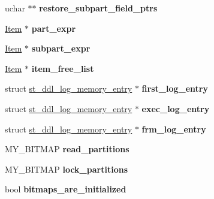 \begin{DoxyCompactItemize}
uchar $\ast$$\ast$ {\bfseries restore\+\_\+subpart\+\_\+field\+\_\+ptrs}
\item 
\mbox{\label{classpartition__info_aeec2b54ced88b3fceab1d27c049af278}} 
\mbox{\hyperlink{classItem}{Item}} $\ast$ {\bfseries part\+\_\+expr}
\item 
\mbox{\label{classpartition__info_a772c8f4582ba3787f603cfb3e6b82659}} 
\mbox{\hyperlink{classItem}{Item}} $\ast$ {\bfseries subpart\+\_\+expr}
\item 
\mbox{\label{classpartition__info_acb41a6573a74fb20315552204cbaec0b}} 
\mbox{\hyperlink{classItem}{Item}} $\ast$ {\bfseries item\+\_\+free\+\_\+list}
\item 
\mbox{\label{classpartition__info_a9ef20001bf9c11c9e1589642751a1bb7}} 
struct \mbox{\hyperlink{structst__ddl__log__memory__entry}{st\+\_\+ddl\+\_\+log\+\_\+memory\+\_\+entry}} $\ast$ {\bfseries first\+\_\+log\+\_\+entry}
\item 
\mbox{\label{classpartition__info_ab4466c77fb8b0e6a6a929b2070711086}} 
struct \mbox{\hyperlink{structst__ddl__log__memory__entry}{st\+\_\+ddl\+\_\+log\+\_\+memory\+\_\+entry}} $\ast$ {\bfseries exec\+\_\+log\+\_\+entry}
\item 
\mbox{\label{classpartition__info_a5c26128df3381830f2e9b19c8a902377}} 
struct \mbox{\hyperlink{structst__ddl__log__memory__entry}{st\+\_\+ddl\+\_\+log\+\_\+memory\+\_\+entry}} $\ast$ {\bfseries frm\+\_\+log\+\_\+entry}
\item 
\mbox{\label{classpartition__info_ada32ee20990cad3ec68521eb55adebe4}} 
M\+Y\+\_\+\+B\+I\+T\+M\+AP {\bfseries read\+\_\+partitions}
\item 
\mbox{\label{classpartition__info_a810b71d635f57a13a1acf4cb97a2a1a2}} 
M\+Y\+\_\+\+B\+I\+T\+M\+AP {\bfseries lock\+\_\+partitions}
\item 
\mbox{\label{classpartition__info_a707cb9fa045b4ffe8e54b3ed7eae4d1c}} 
bool {\bfseries bitmaps\+\_\+are\+\_\+initialized}
\item 
$$
\end{DoxyCompactItemize}
